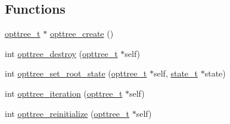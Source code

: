 \subsection*{\-Functions}
\begin{DoxyCompactItemize}
\item 
\hyperlink{a00020_a07b75293fafb6f31b7e9f723848ad105_a07b75293fafb6f31b7e9f723848ad105}{opttree\-\_\-t} $\ast$ \hyperlink{a00020_a9477fb49d51f94d64301104b66f6f193_a9477fb49d51f94d64301104b66f6f193}{opttree\-\_\-create} ()
\item 
int \hyperlink{a00020_a87bc01b7917d322ff2ee448bb4055557_a87bc01b7917d322ff2ee448bb4055557}{opttree\-\_\-destroy} (\hyperlink{a00020_a07b75293fafb6f31b7e9f723848ad105_a07b75293fafb6f31b7e9f723848ad105}{opttree\-\_\-t} $\ast$self)
\item 
int \hyperlink{a00020_a7e5472ef1473797978ce8216b345b7fa_a7e5472ef1473797978ce8216b345b7fa}{opttree\-\_\-set\-\_\-root\-\_\-state} (\hyperlink{a00020_a07b75293fafb6f31b7e9f723848ad105_a07b75293fafb6f31b7e9f723848ad105}{opttree\-\_\-t} $\ast$self, \hyperlink{a00018_a1c9d0bb39483d4981491e6383b0dbb47_a1c9d0bb39483d4981491e6383b0dbb47}{state\-\_\-t} $\ast$state)
\item 
int \hyperlink{a00020_a555d69f9356c39303401f79b5e3c02b8_a555d69f9356c39303401f79b5e3c02b8}{opttree\-\_\-iteration} (\hyperlink{a00020_a07b75293fafb6f31b7e9f723848ad105_a07b75293fafb6f31b7e9f723848ad105}{opttree\-\_\-t} $\ast$self)
\item 
int \hyperlink{a00020_a1a94286b5107f470ea340b615cc1e11c_a1a94286b5107f470ea340b615cc1e11c}{opttree\-\_\-reinitialize} (\hyperlink{a00020_a07b75293fafb6f31b7e9f723848ad105_a07b75293fafb6f31b7e9f723848ad105}{opttree\-\_\-t} $\ast$self)
\end{DoxyCompactItemize}


